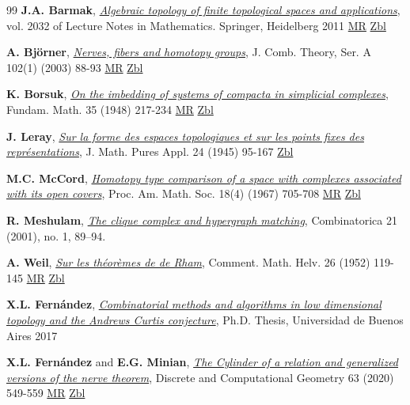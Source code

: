 \documentclass[12pt,a4paper,twoside, reqno, tbtags]{article}
\numberwithin{equation}{section}
\begin{document}
\begin{thebibliography}{99}
	\textbf{J.A. Barmak}, \textit{\href{https://link.springer.com/book/10.1007/978-3-642-22003-6}{Algebraic topology of finite topological spaces and applications}}, vol. 2032 of Lecture Notes in Mathematics. Springer, Heidelberg 2011 \href{https://mathscinet.ams.org/mathscinet/article?mr=3024764}{MR} \href{https://zbmath.org/1235.55001}{Zbl}
	
	\textbf{A. Björner}, \textit{\href{https://www.sciencedirect.com/science/article/pii/S0097316503000153}{Nerves, fibers and homotopy groups}}, J. Comb. Theory, Ser. A 102(1) (2003) 88-93 \href{https://mathscinet.ams.org/mathscinet/article?mr=1970978}{MR} \href{https://zbmath.org/1030.55006}{Zbl}
	
	\textbf{K. Borsuk}, \textit{\href{https://www.semanticscholar.org/paper/On-the-imbedding-of-systems-of-compacta-in-Borsuk/b0350dec1e1b0d09c2a0326a80082dc11cb2ceb4}{On the imbedding of systems of compacta in simplicial complexes}}, Fundam. Math. 35 (1948) 217-234 \href{https://mathscinet.ams.org/mathscinet/article?mr=28019}{MR} \href{https://zbmath.org/0032.12303}{Zbl}
	
	\textbf{J. Leray}, \textit{\href{http://www.numdam.org/item/JMPA_1945_9_24__95_0.pdf}{Sur la forme des espaces topologiques et sur les points fixes des représentations}}, J. Math. Pures Appl. 24 (1945) 95-167 \href{https://zbmath.org/0060.40703}{Zbl}
	
	\textbf{M.C. McCord}, \textit{\href{https://www.ams.org/journals/proc/1967-018-04/S0002-9939-1967-0216499-0/S0002-9939-1967-0216499-0.pdf}{Homotopy type comparison of a space with complexes associated with its open covers}}, Proc. Am. Math. Soc. 18(4) (1967) 705-708 \href{https://mathscinet.ams.org/mathscinet/article?mr=216499}{MR} \href{https://zbmath.org/0171.22001}{Zbl}

    \textbf{R. Meshulam}, \textit{\href{https://link.springer.com/article/10.1007/s004930170006}{The clique complex and hypergraph matching}}, Combinatorica 21 (2001), no. 1, 89--94.
	
	\textbf{A. Weil}, \textit{\href{https://link.springer.com/article/10.1007/BF02564296}{Sur les théorèmes de de Rham}}, Comment. Math. Helv. 26 (1952) 119-145 \href{https://mathscinet.ams.org/mathscinet/article?mr=1473068}{MR} \href{https://zbmath.org/0047.16702}{Zbl}
	
	\textbf{X.L. Fern\'{a}ndez}, \textit{\href{http://cms.dm.uba.ar/academico/carreras/doctorado/Tesis_Ximena_Fernandez.pdf}{Combinatorial methods and algorithms in low dimensional topology and the Andrews Curtis conjecture}}, Ph.D. Thesis, Universidad de Buenos Aires 2017
	
	\textbf{X.L. Fern\'{a}ndez} and \textbf{E.G. Minian}, \textit{\href{https://link.springer.com/article/10.1007/s00454-018-0028-7}{The Cylinder of a relation and generalized versions of the nerve theorem}}, Discrete and Computational Geometry 63 (2020) 549-559 \href{https://mathscinet.ams.org/mathscinet/article?mr=4074333}{MR} \href{https://zbmath.org/1444.55012}{Zbl}
\end{thebibliography}
\end{document}
